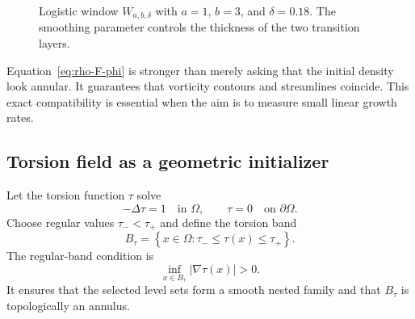 \documentclass[11pt,a4paper]{article}
\newcommand{\Om}{\Omega}
\newcommand{\abs}[1]{\left|#1\right|}
\begin{document}
\begin{figure}[ht]
  \centering
  \caption{Logistic window $W_{a,b,\delta}$ with $a=1$, $b=3$, and $\delta=0.18$. The smoothing parameter controls the thickness of the two transition layers.}
  \label{fig:logistic-window}
\end{figure}

Equation~\eqref{eq:rho-F-phi} is stronger than merely asking that the initial density look annular. It guarantees that vorticity contours and streamlines coincide. This exact compatibility is essential when the aim is to measure small linear growth rates.

\subsection{Torsion field as a geometric initializer}

Let the torsion function $\tau$ solve
\begin{equation}
  -\Delta\tau=1
  \quad\text{in }\Om,
  \qquad
  \tau=0
  \quad\text{on }\partial\Om.
  \label{eq:torsion}
\end{equation}
Choose regular values $\tau_-<\tau_+$ and define the torsion band
\begin{equation}
  B_{\tau}
  =\left\{x\in\Om:\tau_-\leq\tau(x)\leq\tau_+\right\}.
  \label{eq:torsion-band}
\end{equation}
The regular-band condition is
\begin{equation}
  \inf_{x\in B_\tau}\abs{\nabla\tau(x)}>0.
  \label{eq:regular-torsion-band}
\end{equation}
It ensures that the selected level sets form a smooth nested family and that $B_\tau$ is topologically an annulus.
\end{document}

